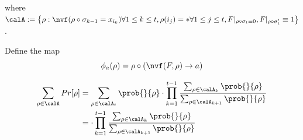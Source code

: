 \newcommand{\A}{\left\{
    \rho: \nvf(\rho \circ \sigma_{k-1} = x_{i_k}) \forall1 \leq  k \leq t, \rho(i_j) = * \forall  1\leq j \leq t, F|_{\rho \circ \sigma_t \equiv 0} , F|_{\rho \circ \sigma_t'} \equiv 1
    \right\}}

\newcommand{\Bk}[1]{\{
    \rho: \ts(\rho(i_{j+1} = \ldots = i_t = *) ), \rho(i_j \to \bar{a_j}, i_{j+1} = \ldots = i_t = *))= \ts_j,\ 
    \rho(i_j) = a_j\ \forall #1 \leq j \leq t;\
    F|_{\rho} \equiv 0,\
    F|_{\rho(i_t \to \bar{a_t})} \equiv 1  
    \}}

\newcommand{\Ck}[1]{\{
    \rho: \ts(\rho, \rho(i_k \to \bar{a_k})= \ts_k;\ts(\rho\circ \sigma_{k+1 \to j}, \rho(i_k \to \bar{a_k})\circ \sigma_{k+1 \to j}')= \ts_j, \rho(i_j) = * \forall #1+1 \leq j \leq t ;
    \rho(i_k) = a_k ,
    F|_{\rho\circ \sigma_{k+1 \to t}} \equiv 0,
    F|_{\rho\circ \sigma_{k+1 \to t}'} \equiv 1  
    \}}
\newcommand{\Ckprime}[1]{\{
    \rho: \ts(\rho(i_k \to a_k), \rho)= \ts_k;\ts(\rho(i_k \to a_k)\circ \sigma_{k+1 \to j}, \rho(i_k \to a_k)\circ \sigma_{k+1 \to j}')= \ts_j, \forall #1+1 \leq j \leq t ;
    \rho(i_k) = \bar{a_k} ,
    F|_{\rho\circ(i_k \to a_k) \sigma_{k+1 \to t}} \equiv 0,
    F|_{\rho\circ(i_k \to a_k) \sigma_{k+1 \to t}'} \equiv 1 
    \}}
    
\newcommand{\calD}{\mathcal{D}}

\newcommand{\Dk}[1]{\{
    \rho: \ts(\rho(i_j \to a_j)\circ \sigma_{k+1 \to j}, \rho\circ \sigma_{k+1 \to j}')= \ts_j, \forall #1 \leq j \leq t ;
    \rho(i_k) = a_k ,
    F|_{\rho\circ \sigma_{k+1 \to t}} \equiv 0,
    F|_{\rho(i_j \to \bar{a_j})\circ \sigma_{k+1 \to t}'} \equiv 1  
    \}}
\newcommand{\Dkprime}[1]{\{
    \rho: \ts(\rho\circ \sigma_{k+1 \to j}, \rho(i_j \to \bar{a_j})\circ \sigma_{k+1 \to j}')= \ts_j, \forall #1+1 \leq j \leq t ;
    \rho(i_k) = a_k ,
    F|_{\rho\circ \sigma_{k+1 \to t}} \equiv 0,
    F|_{\rho(i_j \to \bar{a_j})\circ \sigma_{k+1 \to t}'} \equiv 1  
    \}}


where $\calA := \A$.

Define the map 
    $$\phi_a(\rho) = \rho \circ (\nvf(F,\rho) \to a)$$

    \begin{align*}
        \sum_{\rho \in \calA} Pr[\rho]
        &= \sum_{\rho \in \calA_t} \prob{}{\rho} \cdot \prod_{k=1}^{t-1} \frac{\sum_{\rho \in \calA_k}\prob{}{\rho}}{\sum_{\rho \in \calA_{k+1}}\prob{}{\rho}}\\
        &= \cdot \prod_{k=1}^{t-1} \frac{\sum_{\rho \in \calA_k}\prob{}{\rho}}{\sum_{\rho \in \calA_{k+1}}\prob{}{\rho}}\\
    \end{align*}

